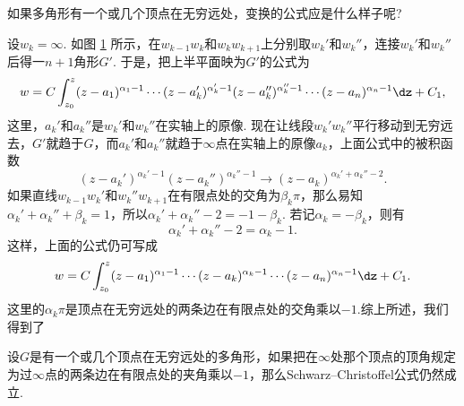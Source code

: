 如果多角形有一个或几个顶点在无穷远处，变换的公式应是什么样子呢?
\begin{figure}[!ht]
\centering
{}
\caption{\label{fig7.7}}
\end{figure}

设$w_k=\infty$. 如图 \ref{fig7.7} 所示，在$w_{k-1}w_k$和$w_kw_{k+1}$上分别取$w_k'$和$w_k''$，连接$w_k'$和$w_k''$后得一$n+1$角形$G'$. 于是，把上半平面映为$G'$的公式为
\[w=C\int_{z_0}^z(z-a_1)^{\alpha_1-1}\cdots(z-a_k')^{\alpha_k'-1}(z-a_k'')^{\alpha_k''-1}
\cdots(z-a_n)^{\alpha_n-1}\dz+C_1,\]
这里，$a_k'$和$a_k''$是$w_k'$和$w_k''$在实轴上的原像. 现在让线段$w_k'w_k''$平行移动到无穷远去，$G'$就趋于$G$，而$a_k'$和$a_k''$就趋于$\infty$点在实轴上的原像$a_k$，上面公式中的被积函数
\[(z-a_k')^{\alpha_k'-1}(z-a_k'')^{\alpha_k''-1}\to(z-a_k)^{\alpha_k'+\alpha_k''-2}.\]
如果直线$w_{k-1}w_k'$和$w_k''w_{k+1}$在有限点处的交角为$\beta_k\pi$，那么易知$\alpha_k'+\alpha_k''+\beta_k=1$，所以$\alpha_k'+\alpha_k''-2=-1-\beta_k$. 若记$\alpha_k=-\beta_k$，则有
\[\alpha_k'+\alpha_k''-2=\alpha_k-1.\]
这样，上面的公式仍可写成
\[w=C\int_{z_0}^z(z-a_1)^{\alpha_1-1}\cdots(z-a_k)^{\alpha_k-1}\cdots(z-a_n)^{\alpha_n-1}
\dz+C_1.\]
这里的$\alpha_k\pi$是顶点在无穷远处的两条边在有限点处的交角乘以$-1$.综上所述，我们得到了
\begin{theorem}\label{thm7.4.6}
设$G$是有一个或几个顶点在无穷远处的多角形，如果把在$\infty$处那个顶点的顶角规定为过$\infty$点的两条边在有限点处的夹角乘以$-1$，那么Schwarz--Christoffel公式仍然成立.
\end{theorem}

